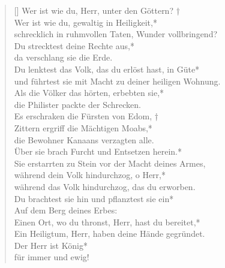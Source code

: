 \begin{verse}[\versewidth]
Wer ist wie du, Herr, unter den Göttern? †\\
Wer ist wie du, gewaltig in Heiligkeit,*\\
schrecklich in ruhmvollen Taten, Wunder vollbringend?\\
Du strecktest deine Rechte aus,*\\
da verschlang sie die Erde.\\
Du lenktest das Volk, das du erlöst hast, in Güte*\\
und führtest sie mit Macht zu deiner heiligen Wohnung.\\
Als die Völker das hörten, erbebten sie,*\\
die Philister packte der Schrecken.\\
Es erschraken die Fürsten von Edom, †\\
Zittern ergriff die Mächtigen Moabs,*\\
die Bewohner Kanaans verzagten alle.\\
Über sie brach Furcht und Entsetzen herein.*\\
Sie erstarrten zu Stein vor der Macht deines Armes,\\
während dein Volk hindurchzog, o Herr,*\\
während das Volk hindurchzog, das du erworben.\\
Du brachtest sie hin und pflanztest sie ein*\\
Auf dem Berg deines Erbes:\\
Einen Ort, wo du thronst, Herr, hast du bereitet,*\\
Ein Heiligtum, Herr, haben deine Hände gegründet.\\

Der Herr ist König*\\
für immer und ewig!\\
 
\end{verse}



\vspace{0.6cm}



